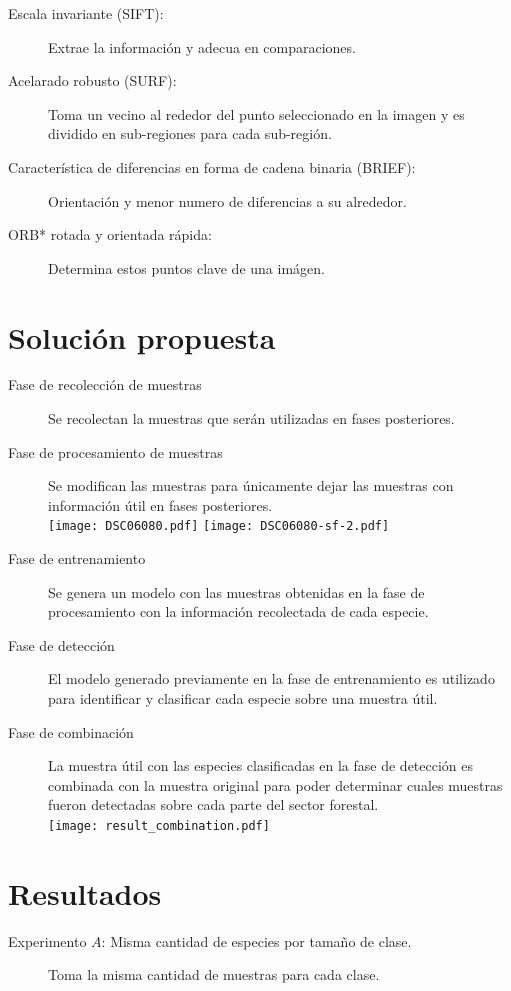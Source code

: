 \documentclass[a0,portrait]{a0poster}
\begin{document}
\begin{multicols}{2}
\begin{description}
\item[Escala invariante (SIFT):]{Extrae la información y adecua en comparaciones.}

\item[Acelarado robusto (SURF):]{Toma un vecino al rededor del punto seleccionado en la imagen y es dividido en sub-regiones para cada sub-región.}

\item[Característica de diferencias en forma de cadena binaria (BRIEF):]{Orientación y menor numero de diferencias a su alrededor.}

\item[ORB* rotada y orientada rápida:]{Determina estos puntos clave de una imágen.}
\end{description}
\vspace*{-15mm}
\section*{Solución propuesta}
\begin{description}
\item[Fase de recolección de muestras]{Se recolectan la muestras que serán utilizadas en fases posteriores.}

\item[Fase de procesamiento  de muestras]{Se modifican las muestras para únicamente dejar las muestras con información útil en fases posteriores.}\\
\hspace*{60mm}\texttt{[image: DSC06080.pdf]}  \texttt{[image: DSC06080-sf-2.pdf]}
\item[Fase de entrenamiento]{Se genera un modelo con las muestras obtenidas en la fase de procesamiento con la información recolectada de cada especie.}

\item[Fase de detección]{El modelo generado previamente en la fase de entrenamiento es utilizado para identificar y clasificar cada especie sobre una muestra útil.}
\item[Fase de combinación]{La muestra útil con las especies clasificadas en la fase de detección es combinada con la muestra original para poder determinar cuales muestras fueron detectadas sobre cada parte del sector forestal.}\\
  \hspace*{120mm}\texttt{[image: result\_combination.pdf]}
\end{description}
\vspace*{-25mm}
\section*{Resultados}
\begin{description}
\item[Experimento $A$: Misma cantidad de especies por tamaño de clase.]{Toma la misma cantidad de muestras para cada clase.}


\end{description}
\end{multicols}
\end{document}
